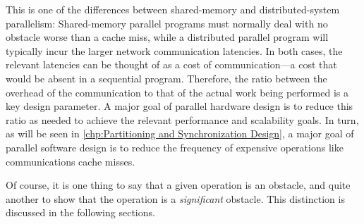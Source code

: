 This is one of the differences between shared-memory and distributed-system
parallelism:
Shared-memory parallel programs must normally deal with no
obstacle worse than a cache miss, while a distributed parallel program
will typically incur the larger network communication latencies.
In both cases, the relevant latencies can be thought of as a cost of
communication---a cost that would be absent in a sequential program.
Therefore, the ratio between the overhead of the communication to
that of the actual work being performed is a key design parameter.
A major goal of parallel hardware design is to reduce this ratio as
needed to achieve the relevant performance and scalability goals.
In turn, as will be seen in
\cref{chp:Partitioning and Synchronization Design},
a major goal of parallel software design is to reduce the
frequency of expensive operations like communications cache misses.

Of course, it is one thing to say that a given operation is an obstacle,
and quite another to show that the operation is a \emph{significant}
obstacle.
This distinction is discussed in the following sections.
